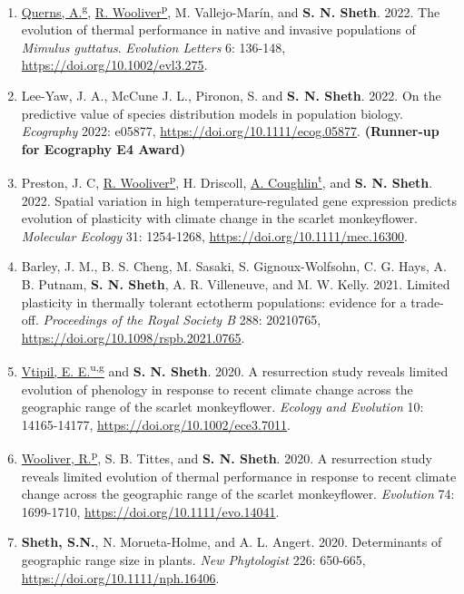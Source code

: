 \documentclass[11pt,english]{article}\usepackage[]{graphicx}\usepackage[]{xcolor}
\begin{document}
\begin{hangparas}{.5in}{1}
\begin{enumerate}
\item \underline{Querns, A.\textsuperscript{g}}, \underline{R. Wooliver\textsuperscript{p}}, M. Vallejo-Mar\'in, and \textbf{S. N. Sheth}. 2022. The evolution of thermal performance in native and invasive populations of \emph{Mimulus guttatus}. \emph{Evolution Letters} 6: 136-148, \url{https://doi.org/10.1002/evl3.275}.

\item Lee-Yaw, J. A., McCune J. L., Pironon, S. and \textbf{S. N. Sheth}. 2022. On the predictive value of species distribution models in population biology. \emph{Ecography} 2022: e05877, \url{https://doi.org/10.1111/ecog.05877}. \textbf{(Runner-up for Ecography E4 Award)}

\item Preston, J. C, \underline{R. Wooliver\textsuperscript{p}}, H. Driscoll, \underline{A. Coughlin\textsuperscript{t}}, and \textbf{S. N. Sheth}. 2022. Spatial variation in high temperature-regulated gene expression predicts evolution of plasticity with climate change in the scarlet monkeyflower. \emph{Molecular Ecology} 31: 1254-1268, \url{https://doi.org/10.1111/mec.16300}. 

\item Barley, J. M., B. S. Cheng, M. Sasaki, S. Gignoux-Wolfsohn, C. G. Hays, A. B. Putnam, \textbf{S. N. Sheth}, A. R. Villeneuve, and M. W. Kelly. 2021. Limited plasticity in thermally tolerant ectotherm populations: evidence for a trade-off. \emph{Proceedings of the Royal Society B} 288: 20210765, \url{https://doi.org/10.1098/rspb.2021.0765}.

\item \underline{Vtipil, E. E.\textsuperscript{u,g}} and \textbf{S. N. Sheth}. 2020. A resurrection study reveals limited evolution of phenology in response to recent climate change across the geographic range of the scarlet monkeyflower. \emph{Ecology and Evolution} 10: 14165-14177, \url{https://doi.org/10.1002/ece3.7011}.

\item \underline{Wooliver, R.\textsuperscript{p}}, S. B. Tittes, and \textbf{S. N. Sheth}. 2020. A resurrection study reveals limited evolution of thermal performance in response to recent climate change across the geographic range of the scarlet monkeyflower. \emph{Evolution} 74: 1699-1710, \url{https://doi.org/10.1111/evo.14041}.

\item \textbf{Sheth, S.N.}, N. Morueta-Holme, and A. L. Angert. 2020. Determinants of geographic range size in plants. \emph{New Phytologist} 226: 650-665, \url{https://doi.org/10.1111/nph.16406}.


\end{enumerate}
\end{hangparas}
\end{document}
